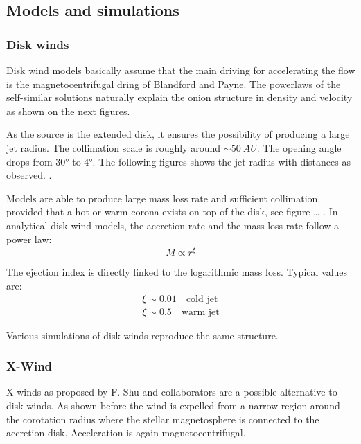 \documentclass[10pt,a4paper,english]{article}
\begin{document}

\subsection{Models and simulations}

\subsubsection{Disk winds}

Disk wind models basically assume that the main driving for accelerating the
flow is the magnetocentrifugal dring of Blandford and Payne. The powerlaws of
the self-similar solutions naturally explain the onion structure in density and
velocity as shown on the next figures.


As the source is the extended disk, it ensures the possibility of producing a
large jet radius. The collimation scale is roughly around $\sim \SI{50}{AU}$.
The opening angle drops from \ang{30} to \ang{4}. The following figures shows
the jet radius with distances as observed. .

Models are able to produce large mass loss rate and sufficient collimation,
provided that a hot or warm corona exists on top of the disk, see figure …
. In analytical disk wind models, the accretion rate and the
mass loss rate follow a power law:
\begin{equation}
    \dot{M} \propto r^\xi
\end{equation}

The ejection index is directly linked to the logarithmic mass loss. Typical
values are:
\begin{align}
    \xi \sim 0.01 \quad \textrm{cold jet} \\
    \xi \sim 0.5 \quad \textrm{warm jet}
\end{align}

Various simulations of disk winds reproduce the same structure.

\subsubsection{X-Wind}

X-winds as proposed by F. Shu and collaborators are a possible alternative to
disk winds. As shown before the wind is expelled from a narrow region around
the corotation radius where the stellar magnetosphere is connected to the
accretion disk. Acceleration is again magnetocentrifugal.
\end{document}
